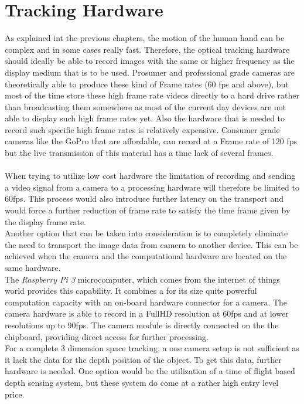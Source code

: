 \section{Tracking Hardware}
 As explained int the previous chapters, the motion of the human hand can be complex and in some cases really fast. Therefore, the optical tracking hardware should ideally be able to record images with the same or higher frequency as the display medium that is to be used. Prosumer and professional grade cameras are theoretically able to produce these kind of Frame rates (60 fps and above), but most of the time store these high frame rate videos directly to a hard drive rather than broadcasting them somewhere as most of the current day devices are not able to display such high frame rates yet. Also the hardware that is needed to record such specific high frame rates is relatively expensive. Consumer grade cameras like the GoPro that are affordable, can record at a Frame rate of 120 fps but the live transmission of this material has a time lack of several frames.\\
\\When trying to utilize low cost hardware the limitation of recording and sending a video signal from a camera to a processing hardware will therefore be limited to 60fps. This process would also introduce further latency on the transport and would force a further reduction of frame rate to satisfy the time frame given by the display frame rate.
\\Another option that can be taken into consideration is to completely eliminate the need to transport the image data from camera to another device. This can be achieved when the camera and the computational hardware are located on the same hardware.\\The \textit{Raspberry Pi 3} microcomputer, which comes from the internet of things world provides this capability. It combines a for its size quite powerful computation capacity with an on-board hardware connector for a camera. The camera hardware is able to record in a FullHD resolution at 60fps and at lower resolutions up to 90fps. The camera module is directly connected on the the chipboard, providing direct access for further processing.\\
For a complete 3 dimension space tracking, a one camera setup is not sufficient as it lack the data for the depth position of the object. To get this data, further hardware is needed. One option would be the utilization of a time of flight based depth sensing system, but these system do come at a rather high entry level price.
